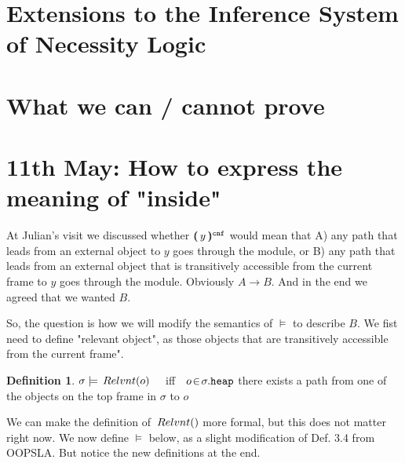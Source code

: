\documentclass[11pt]{article} %
\theoremstyle{definition}
\newtheorem{definition}{Definition}[section]
\begin{document}
\section{Extensions to the Inference System of Necessity Logic}


\section{What we can / cannot prove}
 

 \section{11th May: How to express the meaning of "inside"}

At Julian's visit we discussed whether $ (\!\!( \, y \, )\!\!)^{{\texttt{cnf}}} $ 
would mean that 
A) any path that leads from an external object   to $y$ goes through the module, or 
B)  any path that leads from an external object that is transitively accessible from the current frame  to $y$ goes through the module. Obviously $A \rightarrow B$. And in the end we agreed that we wanted $B$.

So, the question is how we will modify the semantics of $\models$ to describe $B$.
We fist need to define "relevant object", as those objects  that are transitively accessible from the current frame". 



\begin{definition}
$\sigma \models \,Relvnt(o)$ \ \ iff\ \ $o\!\in\!\sigma.{\texttt{heap}}$ there exists a path from one of the objects on the top frame in $\sigma$ to $o$
\end{definition}

We can make the definition of $\Relevant$ more formal, but this does not matter right now.
We now define $\models$ below, as a slight modification of   Def. 3.4 from OOPSLA. But notice the new definitions at the end.
\end{document}
